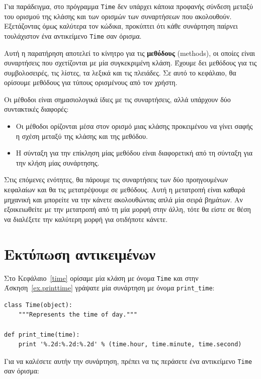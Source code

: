 \documentclass[10pt]{book}
\begin{document}
Για παράδειγμα, στο πρόγραμμα {\tt Time} δεν υπάρχει κάποια προφανής σύνδεση μεταξύ του ορισμού της κλάσης
και των ορισμών των συναρτήσεων που ακολουθούν. Εξετάζοντας όμως καλύτερα τον κώδικα, προκύπτει ότι κάθε
συνάρτηση παίρνει τουλάχιστον ένα αντικείμενο {\tt Time} σαν όρισμα.

Αυτή η παρατήρηση αποτελεί το κίνητρο για τις {\bf μεθόδους} (methods), οι οποίες είναι συναρτήσεις που
σχετίζονται με μία συγκεκριμένη κλάση. Έχουμε δει μεθόδους για τις συμβολοσειρές, τις λίστες, τα λεξικά και
τις πλειάδες. Σε αυτό το κεφάλαιο, θα ορίσουμε μεθόδους για τύπους ορισμένους από τον χρήστη.

Οι μέθοδοι είναι σημασιολογικά ίδιες με τις συναρτήσεις, αλλά υπάρχουν δύο συντακτικές διαφορές:

\begin{itemize}

\item Οι μέθοδοι ορίζονται μέσα στον ορισμό μιας κλάσης προκειμένου να γίνει σαφής η σχέση μεταξύ της κλάσης
και της μεθόδου.

\item Η σύνταξη για την επίκληση μίας μεθόδου είναι διαφορετική από τη σύνταξη για την κλήση μίας συνάρτησης.

\end{itemize}

Στις επόμενες ενότητες, θα πάρουμε τις συναρτήσεις των δύο προηγουμένων κεφαλαίων και θα τις μετατρέψουμε σε
μεθόδους. Αυτή η μετατροπή είναι καθαρά μηχανική και μπορείτε να την κάνετε ακολουθώντας απλά μία σειρά βημάτων.
Αν εξοικειωθείτε με την μετατροπή από τη μία μορφή στην άλλη, τότε θα είστε σε θέση να διαλέξετε την καλύτερη
μορφή για οτιδήποτε κάνετε.


\section{Εκτύπωση αντικειμένων}

Στο Κεφάλαιο~\ref{time} ορίσαμε μία κλάση με όνομα {\tt Time} και στην Άσκηση~\ref{ex.printtime} γράψατε μία
συνάρτηση με όνομα \verb"print_time":

\begin{verbatim}
class Time(object):
    """Represents the time of day."""

def print_time(time):
    print '%.2d:%.2d:%.2d' % (time.hour, time.minute, time.second)
\end{verbatim}
%
Για να καλέσετε αυτήν την συνάρτηση, πρέπει να τις περάσετε ένα αντικείμενο {\tt Time} σαν όρισμα:
\end{document}
